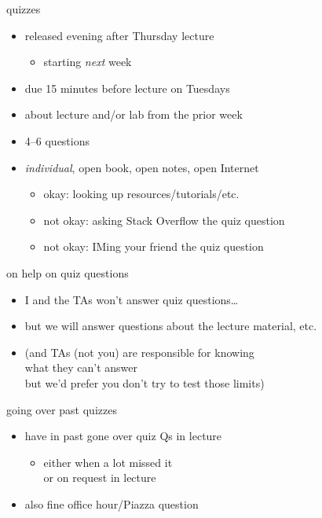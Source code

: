 \begin{frame}{quizzes}
    \begin{itemize}
    \item released evening after Thursday lecture
        \begin{itemize}
        \item starting \textit{next} week
        \end{itemize}
    \item due 15 minutes before lecture on Tuesdays
    \vspace{.5cm}
    \item about lecture and/or lab from the prior week
    \item 4--6 questions
    \item \textit{individual}, open book, open notes, open Internet
        \begin{itemize}
        \item okay: looking up resources/tutorials/etc.
        \item not okay: asking Stack Overflow the quiz question
        \item not okay: IMing your friend the quiz question
        \end{itemize}
    \end{itemize}
\end{frame}

\begin{frame}{on help on quiz questions}
    \begin{itemize}
    \item I and the TAs won't answer quiz questions\ldots
    \item but we will answer questions about the lecture material, etc.
    \vspace{.5cm}
    \item (and TAs (not you) are responsible for knowing \\
        what they can't answer \\
        but we'd prefer you don't try to test those limits)
    \end{itemize}
\end{frame}

\begin{frame}{going over past quizzes}
    \begin{itemize}
    \item have in past gone over quiz Qs in lecture
        \begin{itemize}
        \item either when a lot missed it \\
             or on request in lecture
         \end{itemize}
    \item also fine office hour/Piazza question
    \end{itemize}
\end{frame}
